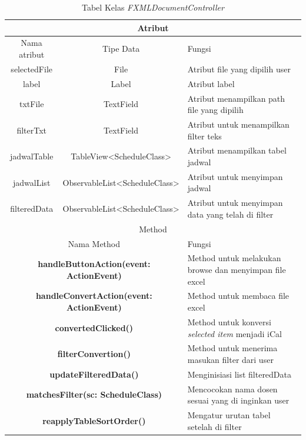 \begin{table}[H]
	\centering
		\caption{Tabel Kelas \textit{FXMLDocumentController}}
		\label{tab:FXMLDocumentController}
		\begin{tabular}{ | c | c | p{4cm} |}
			\hline
				\multicolumn{3}{|c|}{Atribut} \\ \hline 
				Nama atribut & Tipe Data  & Fungsi \\ \hline
				selectedFile & File & Atribut file yang dipilih user\\ \hline
				label & Label & Atribut label\\ \hline
				txtFile & TextField & Atribut menampilkan path file yang dipilih\\ \hline
				filterTxt & TextField & Atribut untuk menampilkan filter teks\\ \hline
				jadwalTable & TableView<ScheduleClass> & Atribut menampilkan tabel jadwal\\ \hline
				jadwalList & ObservableList<ScheduleClass> & Atribut untuk menyimpan jadwal\\ \hline
				filteredData & ObservableList<ScheduleClass> & Atribut untuk menyimpan data yang telah di filter\\ \hline
				\multicolumn{3}{|c|}{Method} \\ \hline
				\multicolumn{2}{|c|}{Nama Method} & Fungsi \\ \hline
				\multicolumn{2}{|c|}{\textbf{handleButtonAction(event: ActionEvent)}} & Method untuk melakukan browse dan menyimpan file excel\\ \hline
				\multicolumn{2}{|c|}{\textbf{handleConvertAction(event: ActionEvent)}} & Method untuk membaca file excel \\ \hline
				\multicolumn{2}{|c|}{\textbf{convertedClicked()}} & Method untuk konversi \textit{selected item} menjadi iCal  \\ \hline
				\multicolumn{2}{|c|}{\textbf{filterConvertion()}} & Method untuk menerima masukan filter dari user \\ \hline
				\multicolumn{2}{|c|}{\textbf{updateFilteredData()}} & Menginisiasi list filteredData \\ \hline
				\multicolumn{2}{|c|}{\textbf{matchesFilter(sc: ScheduleClass)}} & Mencocokan nama dosen sesuai yang di inginkan user \\ \hline
				\multicolumn{2}{|c|}{\textbf{reapplyTableSortOrder()}} & Mengatur urutan tabel setelah di filter \\ \hline
		\end{tabular}
\end{table}

